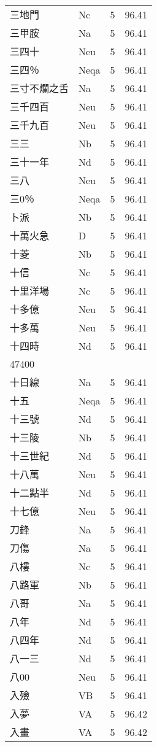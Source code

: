 \documentclass[twocolumn]{book}
\begin{document}
\begin{supertabular}{llrr}
三地門 & Nc & 5 &  96.41\\
三甲胺 & Na & 5 &  96.41\\
三四十 & Neu & 5 &  96.41\\
三四％ & Neqa & 5 &  96.41\\
三寸不爛之舌 & Na & 5 &  96.41\\
三千四百 & Neu & 5 &  96.41\\
三千九百 & Neu & 5 &  96.41\\
三三 & Nb & 5 &  96.41\\
三十一年 & Nd & 5 &  96.41\\
三八 & Neu & 5 &  96.41\\
三0％ & Neqa & 5 &  96.41\\
卜派 & Nb & 5 &  96.41\\
十萬火急 & D & 5 &  96.41\\
十菱 & Nb & 5 &  96.41\\
十信 & Nc & 5 &  96.41\\
十里洋場 & Nc & 5 &  96.41\\
十多億 & Neu & 5 &  96.41\\
十多萬 & Neu & 5 &  96.41\\
十四時 & Nd & 5 &  96.41\\
47400\\
十日線 & Na & 5 &  96.41\\
十五 & Neqa & 5 &  96.41\\
十三號 & Nd & 5 &  96.41\\
十三陵 & Nb & 5 &  96.41\\
十三世紀 & Nd & 5 &  96.41\\
十八萬 & Neu & 5 &  96.41\\
十二點半 & Nd & 5 &  96.41\\
十七億 & Neu & 5 &  96.41\\
刀鋒 & Na & 5 &  96.41\\
刀傷 & Na & 5 &  96.41\\
八樓 & Nc & 5 &  96.41\\
八路軍 & Nb & 5 &  96.41\\
八哥 & Na & 5 &  96.41\\
八年 & Nd & 5 &  96.41\\
八四年 & Nd & 5 &  96.41\\
八一三 & Nd & 5 &  96.41\\
八00 & Neu & 5 &  96.41\\
入殮 & VB & 5 &  96.41\\
入夢 & VA & 5 &  96.42\\
入畫 & VA & 5 &  96.42\\

\end{supertabular}
\end{document}
